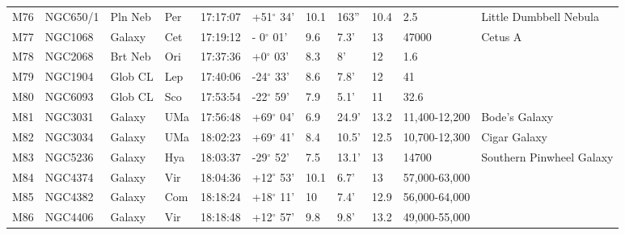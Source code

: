 \documentclass[10pt,twoside,a4paper,english]{article}
\begin{document}
\begin{longtable}{@{}lllllllllll@{}}
M76        & NGC650/1    & Pln Neb    & Per       & 17:17:07 & +51$^{\circ}$ 34'  & 10.1      & 163''                & 10.4     & 2.5                 & Little Dumbbell Nebula                    \\ 
M77        & NGC1068     & Galaxy     & Cet       & 17:19:12 & - 0$^{\circ}$ 01'  & 9.6       & 7.3'                 & 13       & 47000               & Cetus A                                   \\ 
M78        & NGC2068     & Brt Neb    & Ori       & 17:37:36 & +0$^{\circ}$ 03'   & 8.3       & 8'                   & 12       & 1.6                 &                                           \\ 
M79        & NGC1904     & Glob CL    & Lep       & 17:40:06 & -24$^{\circ}$ 33'  & 8.6       & 7.8'                 & 12       & 41                  &                                           \\ 
M80        & NGC6093     & Glob CL    & Sco       & 17:53:54 & -22$^{\circ}$ 59'  & 7.9       & 5.1'                 & 11       & 32.6                &                                           \\ 
M81        & NGC3031     & Galaxy     & UMa       & 17:56:48 & +69$^{\circ}$ 04'  & 6.9       & 24.9'                & 13.2     & 11,400-12,200       & Bode's Galaxy                             \\ 
M82        & NGC3034     & Galaxy     & UMa       & 18:02:23 & +69$^{\circ}$ 41'  & 8.4       & 10.5'                & 12.5     & 10,700-12,300       & Cigar Galaxy                              \\ 
M83        & NGC5236     & Galaxy     & Hya       & 18:03:37 & -29$^{\circ}$ 52'  & 7.5       & 13.1'                & 13       & 14700               & Southern Pinwheel Galaxy                  \\ 
M84        & NGC4374     & Galaxy     & Vir       & 18:04:36 & +12$^{\circ}$ 53'  & 10.1      & 6.7'                 & 13       & 57,000-63,000       &                                           \\ 
M85        & NGC4382     & Galaxy     & Com       & 18:18:24 & +18$^{\circ}$ 11'  & 10        & 7.4'                 & 12.9     & 56,000-64,000       &                                           \\ 
M86        & NGC4406     & Galaxy     & Vir       & 18:18:48 & +12$^{\circ}$ 57'  & 9.8       & 9.8'                 & 13.2     & 49,000-55,000       &                                           \\ 

\end{longtable}
\end{document}
